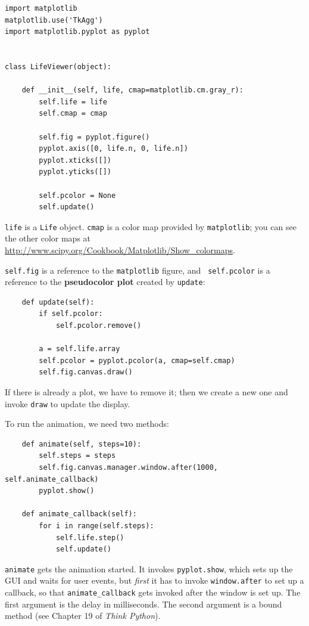 \documentclass[10pt]{book}
\begin{document}
\begin{verbatim}
import matplotlib
matplotlib.use('TkAgg')
import matplotlib.pyplot as pyplot


class LifeViewer(object):

    def __init__(self, life, cmap=matplotlib.cm.gray_r):
        self.life = life
        self.cmap = cmap

        self.fig = pyplot.figure()
        pyplot.axis([0, life.n, 0, life.n])
        pyplot.xticks([])
        pyplot.yticks([])

        self.pcolor = None
        self.update()
\end{verbatim}

{\tt life} is a {\tt Life} object.  {\tt cmap} is a color map
provided by {\tt matplotlib}; you can see the other
color maps at \url{http://www.scipy.org/Cookbook/Matplotlib/Show_colormaps}.

{\tt self.fig} is a reference to the {\tt matplotlib} figure, and {\tt
  self.pcolor} is a reference to the {\bf pseudocolor plot} created by
{\tt update}:

\begin{verbatim}
    def update(self):
        if self.pcolor:
            self.pcolor.remove()

        a = self.life.array
        self.pcolor = pyplot.pcolor(a, cmap=self.cmap)
        self.fig.canvas.draw()
\end{verbatim}

If there is already a plot, we have to remove it; then we create
a new one and invoke {\tt draw} to update the display.

To run the animation, we need two methods:

\begin{verbatim}
    def animate(self, steps=10):
        self.steps = steps
        self.fig.canvas.manager.window.after(1000, self.animate_callback)
        pyplot.show()

    def animate_callback(self):
        for i in range(self.steps):
            self.life.step()
            self.update()
\end{verbatim}

{\tt animate} gets the animation started.  It invokes {\tt pyplot.show},
which sets up the GUI and waits for user events, but {\em first} it has
to invoke {\tt window.after} to set up a callback, so that 
\verb"animate_callback" gets invoked after the window is set up.
The first argument is the delay in milliseconds.  The second
argument is a bound method (see Chapter 19 of {\em Think Python}).
\end{document}
